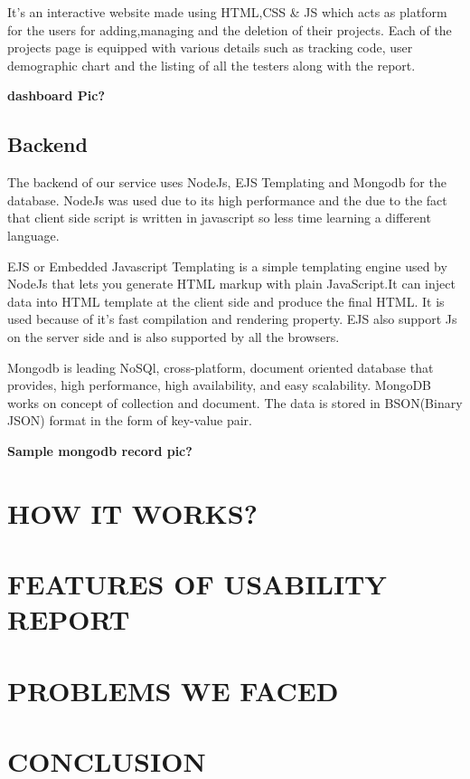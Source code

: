 \documentclass[12pt,a4paper,final]{extreport}
\begin{document}
It's an interactive website made using HTML,CSS \& JS which acts as platform for the users for adding,managing and the deletion of their projects.
Each of the projects page is equipped with various details such as tracking code, user demographic chart and the listing of all the testers along with the report.

\textbf{dashboard Pic?}
\newpage
\section{Backend}
The backend of our service uses NodeJs, EJS Templating and Mongodb for the database.
NodeJs was used due to its high performance and the due to the fact that client side script is written in javascript so less time learning a different language.

EJS or Embedded Javascript Templating is a simple templating engine used by NodeJs that lets you generate HTML markup with plain JavaScript.It can inject data into HTML template at the client side and produce the final HTML. It is used because of it's fast compilation and rendering property.
EJS also support Js on the server side and is also supported by all the browsers.

Mongodb is leading NoSQl, cross-platform, document oriented database that provides, high performance, high availability, and easy scalability. MongoDB works on concept of collection and document. The data is stored in BSON(Binary JSON) format in the form of key-value pair.

\textbf{Sample mongodb record pic?}

\newpage
\chapter{HOW IT WORKS?}


\newpage
\chapter{FEATURES OF USABILITY REPORT}

\newpage
\chapter{PROBLEMS WE FACED}

\newpage
\chapter{CONCLUSION }
\end{document}
